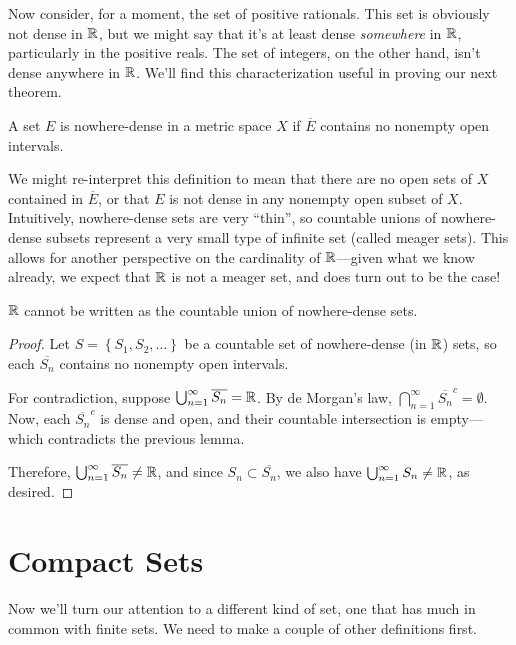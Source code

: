 \documentclass[../m131main.tex]{subfiles}
\begin{document}
Now consider, for a moment, the set of positive rationals.
This set is obviously not dense in $\mathbb{R}$, but we might say that it's at least dense \textit{somewhere} in $\mathbb{R}$, particularly in the positive reals.
The set of integers, on the other hand, isn't dense anywhere in $\mathbb{R}$.
We'll find this characterization useful in proving our next theorem.

\begin{definition}
    A set $E$ is nowhere-dense in a metric space $X$ if $\overline{E}$ contains no nonempty open intervals.
\end{definition}

We might re-interpret this definition to mean that there are no open sets of $X$ contained in $\overline{E}$, or that $E$ is not dense in any nonempty open subset of $X$.
Intuitively, nowhere-dense sets are very ``thin'', so countable unions of nowhere-dense subsets represent a very small type of infinite set (called meager sets).
This allows for another perspective on the cardinality of $\mathbb{R}$---given what we know already, we expect that $\mathbb{R}$ is not a meager set, and does turn out to be the case!

\begin{theorem}
    $\mathbb{R}$ cannot be written as the countable union of nowhere-dense sets.
\end{theorem}

\begin{proof}
    Let $S = \left\{ S_1, S_2, \ldots \right\}$ be a countable set of nowhere-dense (in $\mathbb{R}$) sets, so each $\overline{S_n}$ contains no nonempty open intervals.

    For contradiction, suppose $\bigcup_{n=1}^\infty \overline{S_n} = \mathbb{R}$.
    By de Morgan's law, $\bigcap_{n=1}^\infty \overline{S_n}^c = \emptyset$.
    Now, each $\overline{S_n}^c$ is dense and open, and their countable intersection is empty---which contradicts the previous lemma.

    Therefore, $\bigcup_{n=1}^\infty \overline{S_n} \neq \mathbb{R}$, and since $S_n \subset \overline{S_n}$, we also have $\bigcup_{n=1}^\infty S_n \neq \mathbb{R}$, as desired.
\end{proof}

\section{Compact Sets}
Now we'll turn our attention to a different kind of set, one that has much in common with finite sets.
We need to make a couple of other definitions first.
\end{document}
